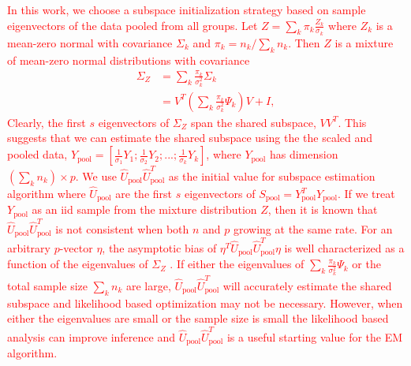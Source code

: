 \documentclass{statsoc}
\newcommand{\edits}[1]{{\textsf{\textcolor{red}{#1}}}}
\newcommand{\edits}[1]{#1}
\begin{document}
\edits{In this work, we choose a subspace initialization strategy
  based on sample eigenvectors of the data pooled from all groups.    Let
  $ Z = \sum_k \pi_k \frac{Z_k}{\sigma_k}$ where $Z_k$ is a mean-zero
  normal with covariance $\Sigma_k$ and $\pi_k = n_k / \sum_k
  n_k$. Then $Z$ is a
  mixture of mean-zero normal distributions with covariance 
  \begin{align*}
\Sigma_Z &= \sum_k \frac{\pi_k}{\sigma^2_k} \Sigma_k\\
  &= V^T( \sum_k \frac{\pi_k}{\sigma_k^2} \Psi_k)V + I,
  \end{align*} Clearly, the first $s$
  eigenvectors of $\Sigma_Z$ span the shared subspace, $VV^T$.  This suggests
  that we can estimate the shared subspace using the the scaled and pooled
  data, $Y_{\text{pool}} = [\frac{1}{\sigma_1}Y_1;
  \frac{1}{\sigma_2}Y_2;...;  \frac{1}{\sigma_k}Y_k]$, where
  $Y_{\text{pool}}$ has dimension $(\sum_k n_k) \times p$.  
  We use $\hat{U}_{\text{pool}}\hat{U}_{\text{pool}}^T$  as the
  initial value for subspace estimation algorithm where 
  $\hat{U}_{\text{pool}}$ are the first $s$ eigenvectors of
  $S_{\text{pool}} = Y_{\text{pool}}^TY_{\text{pool}}$.
  If we
  treat $Y_{\text{pool}}$ as an iid sample from the mixture
  distribution $Z$,  then it is known that  $\hat{U}_{\text{pool}}\hat{U}_{\text{pool}}^T$ is not
  consistent when both $n$ and $p$ growing at the same rate.}
\edits{For an arbitrary $p$-vector $\eta$, the asymptotic bias of
  $\eta^T\hat{U}_{\text{pool}}\hat{U}_{\text{pool}}^T\eta$ is well
  characterized as a function of the eigenvalues of $\Sigma_Z$ \citep{Mestre2008}.  If either the eigenvalues of $\sum_k
  \frac{\pi_k}{\sigma_k^2} \Psi_k$ or the total sample size $\sum_k n_k$
  are large, $\hat{U}_{\text{pool}}\hat{U}_{\text{pool}}^T$ will
  accurately estimate the shared subspace and likelihood based
  optimization may not be necessary.  However, when either the eigenvalues are
  small or the sample size is small the likelihood based analysis can
  improve inference and $\hat{U}_{\text{pool}}\hat{U}_{\text{pool}}^T$ is a useful starting value for the EM algorithm.}






\end{document}
